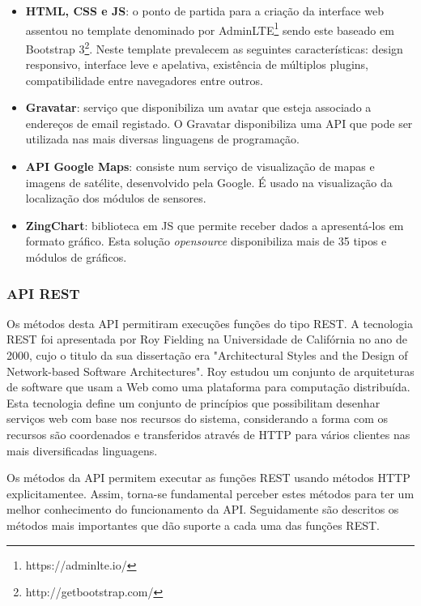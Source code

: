 \begin{itemize}
	\item \textbf{\acs{HTML}, \acs{CSS} e \acs{JS}}: o ponto de partida para a criação da interface web assentou no template denominado por AdminLTE\footnote{https://adminlte.io/} sendo este baseado em Bootstrap 3\footnote{http://getbootstrap.com/}. Neste template prevalecem as seguintes características:  design responsivo, interface leve e apelativa, existência de múltiplos plugins, compatibilidade entre navegadores entre outros. 
	
	\item \textbf{Gravatar}: serviço que disponibiliza um avatar que esteja associado a endereços de email registado. O Gravatar disponibiliza uma API que pode ser utilizada nas mais diversas linguagens de programação\cite{gravatar}.
	 
	\item \textbf{\ac{API} Google Maps}: consiste num serviço de visualização de mapas e imagens de satélite, desenvolvido pela Google. É usado na visualização da localização dos módulos de sensores. 
	
	\item \textbf{ZingChart}: biblioteca em \ac{JS} que permite receber dados a apresentá-los em formato gráfico. Esta solução \textit{opensource} disponibiliza mais de 35 tipos e módulos de gráficos. 
\end{itemize}





\subsubsection{\acs{API} \acs{REST}}


Os métodos desta \ac{API} permitiram execuções funções do tipo \ac{REST}. A tecnologia \ac{REST} foi apresentada por Roy Fielding na Universidade de Califórnia no ano de 2000, cujo o titulo da sua dissertação era "Architectural Styles and the Design of Network-based Software Architectures". Roy estudou um conjunto de arquiteturas de software que usam a Web como uma plataforma para computação distribuída\cite{Rodriguez2015}. Esta tecnologia define um conjunto de princípios que possibilitam desenhar serviços web com base nos recursos do sistema, considerando a forma com os recursos são coordenados e transferidos através de \ac{HTTP} para vários clientes nas mais diversificadas linguagens. 

Os métodos da API permitem executar as funções \ac{REST} usando métodos \ac{HTTP} explicitamentee. Assim, torna-se fundamental perceber estes métodos para ter um melhor conhecimento do funcionamento da \ac{API}. Seguidamente são descritos os métodos mais importantes que dão suporte a cada uma das funções \ac{REST}.


